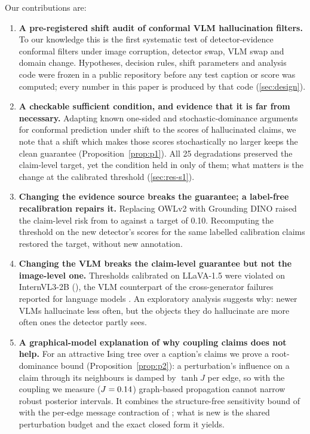 Our contributions are:
\begin{enumerate}[leftmargin=*,itemsep=1pt]
  \item \textbf{A pre-registered shift audit of conformal VLM hallucination filters.} To our knowledge this is the first systematic test of detector-evidence conformal filters under image corruption, detector swap, VLM swap and domain change. Hypotheses, decision rules, shift parameters and analysis code were frozen in a public repository before any test caption or score was computed; every number in this paper is produced by that code (\cref{sec:design}).
  \item \textbf{A checkable sufficient condition, and evidence that it is far from necessary.} Adapting known one-sided and stochastic-dominance arguments for conformal prediction under shift \citep{clarkson2024split,doula2026conformal} to the scores of hallucinated claims, we note that a shift which makes those scores stochastically no larger keeps the clean guarantee (Proposition~\ref{prop:p1}). All 25 degradations preserved the claim-level target, yet the condition held in only \NHtwo{} of them; what matters is the change at the calibrated threshold (\cref{sec:res-s1}).
  \item \textbf{Changing the evidence source breaks the guarantee; a label-free recalibration repairs it.} Replacing OWLv2 with Grounding DINO raised the claim-level risk from \CleanClaim{} to \GdinoClaim{} against a target of 0.10. Recomputing the threshold on the new detector's scores for the same labelled calibration claims restored the target, without new annotation.
  \item \textbf{Changing the VLM breaks the claim-level guarantee but not the image-level one.} Thresholds calibrated on LLaVA-1.5 were violated on InternVL3-2B (\InternClaim{}), the VLM counterpart of the cross-generator failures reported for language models \citep{chen2026conformalrag}. An exploratory analysis suggests why: newer VLMs hallucinate less often, but the objects they do hallucinate are more often ones the detector partly sees.
  \item \textbf{A graphical-model explanation of why coupling claims does not help.} For an attractive Ising tree over a caption's claims we prove a root-dominance bound (Proposition~\ref{prop:p2}): a perturbation's influence on a claim through its neighbours is damped by $\tanh J$ per edge, so with the coupling we measure ($J=0.14{}$) graph-based propagation cannot narrow robust posterior intervals. It combines the structure-free sensitivity bound of \citet{chan2002numbers} with the per-edge message contraction of \citet{ihler2005loopy}; what is new is the shared perturbation budget and the exact closed form it yields.
\end{enumerate}

